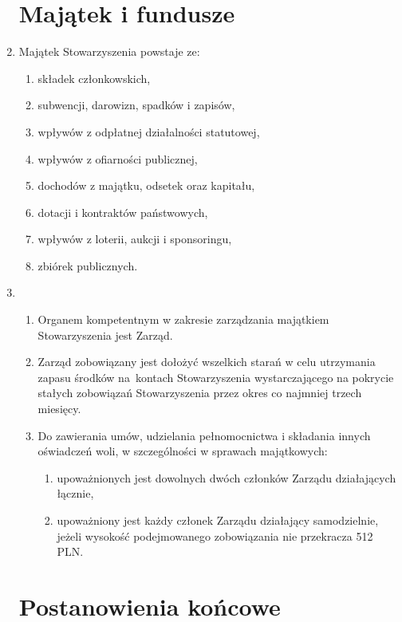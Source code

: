 \documentclass[chapterprefix,notitlepage]{article}
\begin{document}
\begin{enumerate}
\section{Majątek i fundusze}

	\item Majątek Stowarzyszenia powstaje ze:
	\begin{enumerate}[1)]
		\item składek członkowskich,
		\item subwencji, darowizn, spadków i zapisów,
		\item wpływów z odpłatnej działalności statutowej,
		\item wpływów z ofiarności publicznej,
		\item dochodów z majątku, odsetek oraz kapitału,
		\item dotacji i kontraktów państwowych,
		\item wpływów z loterii, aukcji i sponsoringu,
		\item zbiórek publicznych.
	\end{enumerate}
	
	\item \begin{enumerate}
		\item Organem kompetentnym w zakresie zarządzania majątkiem Stowarzyszenia jest Zarząd.
		\item Zarząd zobowiązany jest dołożyć wszelkich starań w celu utrzymania zapasu środków na~kontach Stowarzyszenia wystarczającego na pokrycie stałych zobowiązań Stowarzyszenia przez okres co najmniej trzech miesięcy.
		\item Do zawierania umów, udzielania pełnomocnictwa i składania innych oświadczeń woli, w szczególności w sprawach majątkowych:
		\begin{enumerate}
			\item upoważnionych jest dowolnych dwóch członków Zarządu działających łącznie,
			\item upoważniony jest każdy członek Zarządu działający samodzielnie, jeżeli wysokość podejmowanego zobowiązania nie przekracza 512 PLN.
		\end{enumerate}
	\end{enumerate}
	

\section{Postanowienia końcowe}
	

\end{enumerate}
\end{document}
